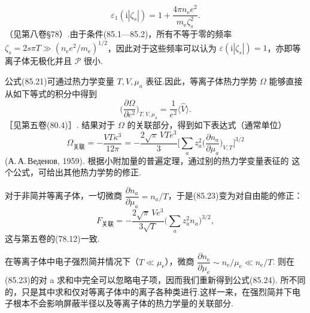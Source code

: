 \begin{equation*}
  \varepsilon_1(\mathrm{i}|\zeta_s|)=1+\frac{4\pi n_{\mathrm{e}}e^{2}}{m_{\mathrm{e}}\zeta_s^{2}}.
\end{equation*}
（见第八卷§78）.由于条件(85.1—85.2)，所有不等于零的频率 $\zeta_s=2s\pi T\gg(n_{\mathrm{e}}e^{2}/m_{\mathrm{e}})^{1/2}$，因此对于这些频率可以认为 $\varepsilon(\mathrm{i}|\zeta_s|)=1$，亦即等离子体无极化并且 $\mathcal{P}$ 很小.

公式(85.21)可通过热力学变量 $T,V,\mu_a$ 表征.因此，等离子体热力学势 $\Omega$ 能够直接从如下等式的积分中得到
\begin{equation}
  \biggl(\frac{\partial\Omega}{\partial e^{2}}\biggr)_{T,V,\mu_a}=\frac{1}{e^{2}}\bigl\langle\hat{V}\bigr\rangle.
\end{equation}
［见第五卷(80.4)］. 结果对于 $\Omega$ 的关联部分，得到如下表达式（通常单位）
\begin{equation}
  \Omega_{\text{关联}}=-\frac{VT\kappa^{3}}{12\pi}=-\frac{2\sqrt{\pi}\,VTe^{3}}{3}\biggl[\sum_{a}z_a^{2}\biggl(\frac{\partial n_a}{\partial\mu_a}\biggr)_{V,T}\biggr]^{3/2}
\end{equation}
(А.\,А.\,Веденов, 1959). 根据小附加量的普遍定理，通过别的热力学变量表征的
这个公式，可给出其他热力学势的修正.

对于非简并等离子体，一切微商 $\dfrac{\partial n_a}{\partial\mu_a}=n_a/T$，于是(85.23)变为对自由能的修正：
\begin{equation}
  F_{\text{关联}}=-\frac{2\sqrt{\pi}\,Ve^{3}}{3\sqrt{T}}\biggl(\sum_{a}z_a^{2}n_a\biggr)^{3/2},
\end{equation}
这与第五卷的(78.12)一致.

在等离子体中电子强烈简并情况下（$T\ll\mu_{\mathrm{e}}$），微商 $\dfrac{\partial n_{\mathrm{e}}}{\partial\mu_{\mathrm{e}}}\sim n_{\mathrm{e}}/\mu_{\mathrm{e}}\ll n_{\mathrm{e}}/T$. 则在(85.23)的对 a 求和中完全可以忽略电子项，因而我们重新得到公式(85.24). 所不同的，只是其中求和仅对等离子体中的离子各种类进行.这样一来，在强烈简并下电子根本不会影响屏蔽半径以及等离子体的热力学量的关联部分.
